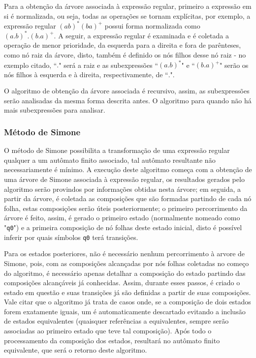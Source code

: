 \documentclass{article}
\begin{document}
            Para a obtenção da árvore associada à expressão regular, primeiro a
            expressão em si é normalizada, ou seja, todas as operações se
            tornam explícitas, por exemplo, a expressão regular
            $(ab)^{*}(ba)^{+}$ possui forma normalizada como
            $(a.b)^{*}.(b.a)^{+}$. A seguir, a expressão regular é examinada e
            é coletada a operação de menor prioridade, da esquerda para a
            direita e fora de parênteses, como nó raiz da árvore, disto, também
            é definido os nós filhos desse nó raiz - no exemplo citado, ``$.$"
            será a raiz e as subexpressões ``$(a.b)^{*}$" e ``$(b.a)^{+}$"
            serão os nós filhos à esquerda e à direita, respectivamente, de
            ``$.$".

            O algoritmo de obtenção da árvore associada é recursivo, assim, as
            subexpressões serão analisadas da mesma forma descrita antes. O
            algoritmo para quando não há mais subexpressões para analisar.

        \subsubsection{Método de Simone}
        \label{subsec:desimone}
            O método de Simone possibilita a transformação de uma expressão
            regular qualquer a um autômato finito associado, tal autômato
            resultante não necessariamente é mínimo. A execução deste algoritmo
            começa com a obtenção de uma árvore de Simone associada à expressão
            regular, os resultados gerados pelo algoritmo serão provindos por
            informações obtidas nesta árvore; em seguida, a partir da árvore, é
            coletada as composições que são formadas partindo de cada nó folha,
            estas composições serão úteis posteriormente; o primeiro
            percorrimento da árvore é feito, assim, é gerado o primeiro estado
            (normalmente nomeado como "\texttt{q0}") e a primeira composição de
            nó folhas deste estado inicial, disto é possível inferir por quais
            símbolos \texttt{q0} terá transições.

            Para os estados posteriores, não é necessário nenhum percorrimento
            à arvore de Simone, pois, com as composições alcançadas por nós
            folhas coletadas no começo do algoritmo, é necessário apenas
            detalhar a composição do estado partindo das composições
            alcançáveis já conhecidas. Assim, durante esses passos, é criado o
            estado em questão e suas transições já são definidas a partir de
            suas composições. Vale citar que o algoritmo já trata de casos
            onde, se a composição de dois estados forem exatamente iguais, um é
            automaticamente descartado evitando a inclusão de estados
            equivalentes (quaisquer referências a equivalentes, sempre serão
            associadas ao primeiro estado que teve tal composição). Após todo o
            processamento da composição dos estados, resultará no autômato
            finito equivalente, que será o retorno deste algoritmo.
\end{document}
